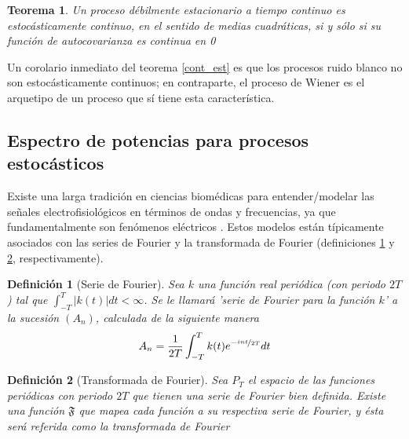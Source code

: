 \documentclass[12pt,a4paper]{mitthesis}
\newtheorem{defn}{Definici\'on}
\newtheorem{thrm}{Teorema}
\newcommand{\simint}[1]{\int_{- #1 }^{ #1 }}
\newcommand{\abso}[1]{\left| #1 \right|}
\begin{document}
\begin{thrm}
Un proceso d\'ebilmente estacionario a tiempo continuo es estoc\'asticamente continuo, en el 
sentido de medias cuadr\'aticas, si y s\'olo si su funci\'on de autocovarianza es continua en 0
\label{cont_est_deb}
\end{thrm}

Un corolario inmediato del teorema \ref{cont_est} es que los procesos ruido blanco no son
estoc\'asticamente continuos; en contraparte, el proceso de Wiener es el arquetipo de un proceso 
que s\'i tiene esta caracter\'istica.


\subsection{Espectro de potencias para procesos estoc\'asticos}

Existe una larga tradici\'on en ciencias biom\'edicas para entender/modelar las se\~nales
electrofisiol\'ogicos en t\'erminos de ondas y frecuencias, ya que fundamentalmente son fen\'omenos 
el\'ectricos \cite{Kaiser00}.  
Estos modelos est\'an t\'ipicamente asociados con las series de Fourier y la transformada de 
Fourier (definiciones \ref{FourierClasico} y \ref{trFourier}, respectivamente).

\begin{defn}[Serie de Fourier]
Sea $k$ una funci\'on real peri\'odica (con periodo $2T$) tal que 
$\simint{T} \abso{k(t)} dt < \infty$. 
Se le llamar\'a 'serie de Fourier para la funci\'on $k$' a la sucesi\'on $\left( A_n \right)$, 
calculada de la siguiente manera
\begin{equation*}
A_n = \frac{1}{2 T} \simint{T} k(t) e^{-\nicefrac{ i n t}{2T}} dt
\end{equation*}
\label{FourierClasico}
\end{defn}

\begin{defn}[Transformada de Fourier]
Sea $P_T$ el espacio de las funciones peri\'odicas con periodo $2T$ que tienen una serie de Fourier 
bien definida. Existe una funci\'on $\mathfrak{F}$ que mapea cada funci\'on a su respectiva serie 
de Fourier, y \'esta ser\'a referida como la transformada de Fourier
\label{trFourier}
\end{defn}
\end{document}
